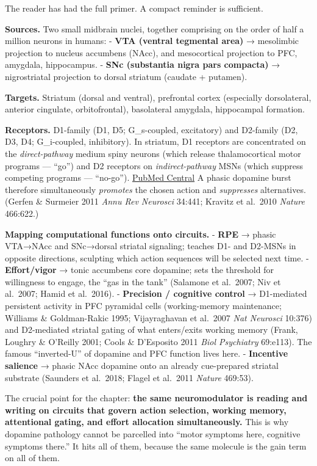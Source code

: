 The reader has had the full primer. A compact reminder is sufficient.

\textbf{Sources.} Two small midbrain nuclei, together comprising on the order of half a million neurons in humans: - \textbf{VTA (ventral tegmental area)} → mesolimbic projection to nucleus accumbens (NAcc), and mesocortical projection to PFC, amygdala, hippocampus. - \textbf{SNc (substantia nigra pars compacta)} → nigrostriatal projection to dorsal striatum (caudate + putamen).

\textbf{Targets.} Striatum (dorsal and ventral), prefrontal cortex (especially dorsolateral, anterior cingulate, orbitofrontal), basolateral amygdala, hippocampal formation.

\textbf{Receptors.} D1-family (D1, D5; G\_s-coupled, excitatory) and D2-family (D2, D3, D4; G\_i-coupled, inhibitory). In striatum, D1 receptors are concentrated on the \emph{direct-pathway} medium spiny neurons (which release thalamocortical motor programs --- ``go'') and D2 receptors on \emph{indirect-pathway} MSNs (which suppress competing programs --- ``no-go''). \href{https://pmc.ncbi.nlm.nih.gov/articles/PMC3853485/}{PubMed Central} A phasic dopamine burst therefore simultaneously \emph{promotes} the chosen action and \emph{suppresses} alternatives. (Gerfen \& Surmeier 2011 \emph{Annu Rev Neurosci} 34:441; Kravitz et al.~2010 \emph{Nature} 466:622.)

\textbf{Mapping computational functions onto circuits.} - \textbf{RPE} → phasic VTA→NAcc and SNc→dorsal striatal signaling; teaches D1- and D2-MSNs in opposite directions, sculpting which action sequences will be selected next time. - \textbf{Effort/vigor} → tonic accumbens core dopamine; sets the threshold for willingness to engage, the ``gas in the tank'' (Salamone et al.~2007; Niv et al.~2007; Hamid et al.~2016). - \textbf{Precision / cognitive control} → D1-mediated persistent activity in PFC pyramidal cells (working-memory maintenance; Williams \& Goldman-Rakic 1995; Vijayraghavan et al.~2007 \emph{Nat Neurosci} 10:376) and D2-mediated striatal gating of what enters/exits working memory (Frank, Loughry \& O'Reilly 2001; Cools \& D'Esposito 2011 \emph{Biol Psychiatry} 69:e113). The famous ``inverted-U'' of dopamine and PFC function lives here. - \textbf{Incentive salience} → phasic NAcc dopamine onto an already cue-prepared striatal substrate (Saunders et al.~2018; Flagel et al.~2011 \emph{Nature} 469:53).

The crucial point for the chapter: \textbf{the same neuromodulator is reading and writing on circuits that govern action selection, working memory, attentional gating, and effort allocation simultaneously.} This is why dopamine pathology cannot be parcelled into ``motor symptoms here, cognitive symptoms there.'' It hits all of them, because the same molecule is the gain term on all of them.

